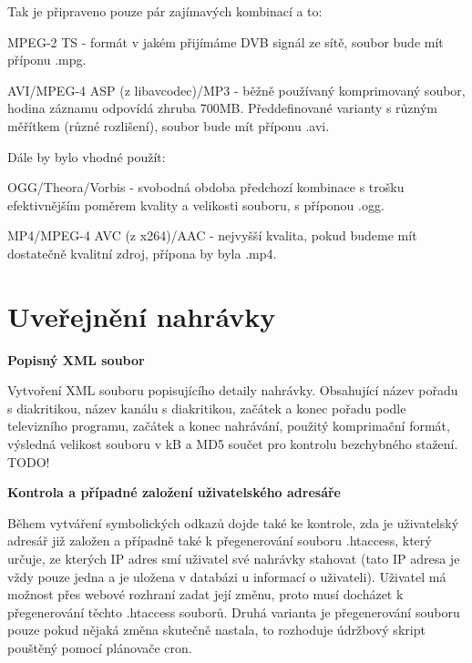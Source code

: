 \vspace{10pt}

Tak je připraveno pouze pár zajímavých kombinací a to:

\vspace{10pt}

MPEG-2 TS - formát v jakém přijímáme DVB signál ze sítě, soubor bude mít příponu .mpg.

AVI/MPEG-4 ASP (z libavcodec)/MP3 - běžně používaný komprimovaný soubor, hodina záznamu odpovídá zhruba 700MB. Předdefinované varianty s různým měřítkem (různé rozlišení), soubor bude mít příponu .avi.

\vspace{10pt}

Dále by bylo vhodné použít:

\vspace{10pt}

OGG/Theora/Vorbis - svobodná obdoba předchozí kombinace s trošku efektivnějším poměrem kvality a velikosti souboru, s příponou .ogg.

MP4/MPEG-4 AVC (z x264)/AAC - nejvyšší kvalita, pokud budeme mít dostatečně kvalitní zdroj, přípona by byla .mp4.

\vspace{10pt}

\section{Uveřejnění nahrávky}

\vspace{10pt}

\textbf{Popisný XML soubor}

Vytvoření XML souboru popisujícího detaily nahrávky. Obsahující název pořadu s diakritikou, název kanálu s diakritikou, začátek a konec pořadu podle televizního programu, začátek a konec nahrávání, použitý komprimační formát, výsledná velikost souboru v kB a MD5 součet pro kontrolu bezchybného stažení.
TODO!

\vspace{10pt}

\textbf{Kontrola a případné založení uživatelského adresáře}

Během vytváření symbolických odkazů dojde také ke kontrole, zda je uživatelský adresář již založen a případně také k přegenerování souboru .htaccess, který určuje, ze kterých IP adres smí uživatel své nahrávky stahovat (tato IP adresa je vždy pouze jedna a je uložena v databázi u informací o uživateli). Uživatel má možnost přes webové rozhraní zadat její změnu, proto musí docházet k přegenerování těchto .htaccess souborů. Druhá varianta je přegenerování souboru pouze pokud nějaká změna skutečně nastala, to rozhoduje údržbový skript pouštěný pomocí plánovače cron. 

